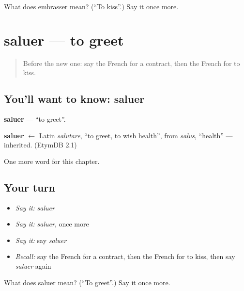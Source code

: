 \begin{tcolorbox}[breakable,colback=teal!4,colframe=teal!35!black,title={Before you move on}]
What does embrasser mean? (\textquotedblleft{}To kiss\textquotedblright{}.) Say it once more.
\end{tcolorbox}
\section[saluer]{saluer — to greet}

\label{lesson:FR-C175-saluer}



\begin{quote}
Before the new one: say the French for a contract, then the French for to kiss.
\end{quote}

\subsection*{You'll want to know: saluer}
\textbf{saluer} — \textquotedblleft{}to greet\textquotedblright{}.

\begin{cousinweb}
\textbf{saluer} $\leftarrow$ Latin \emph{salutare}, \textquotedblleft{}to greet, to wish health\textquotedblright{}, from \emph{salus}, \textquotedblleft{}health\textquotedblright{} — inherited. (EtymDB 2.1)
\end{cousinweb}

\begin{grammarlens}[title={What you've built}]
One more word for this chapter.
\end{grammarlens}

\subsection*{Your turn}
\begin{itemize}
\raggedright
  \item \emph{Say it:} \emph{saluer}
  \item \emph{Say it:} \emph{saluer}, once more
  \item \emph{Say it:} say \emph{saluer}
  \item \emph{Recall:} say the French for a contract, then the French for to kiss, then say \emph{saluer} again
\end{itemize}

\begin{tcolorbox}[breakable,colback=teal!4,colframe=teal!35!black,title={Before you move on}]
What does saluer mean? (\textquotedblleft{}To greet\textquotedblright{}.) Say it once more.
\end{tcolorbox}
